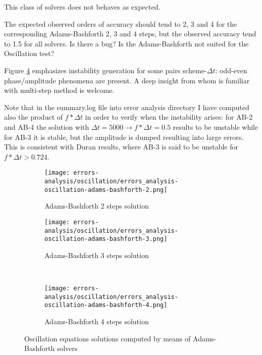 \documentclass[pdftex,preprint,3p,times,numbers]{elsarticle}
\begin{document}
{\color{red}This class of solvers does not behaves as expected.

The expected observed orders of accuracy should tend to 2, 3 and 4 for the corresponding Adams-Bashforth 2, 3 and 4 steps, but the observed accuracy tend to 1.5 for all solvers. Is there a bug? Is the Adams-Bashforth not suited for the Oscillation test?

Figure \ref{fig:results-oscillation-adams-bashforth} emphasizes instability generation for some pairs scheme-$\Delta t$: odd-even phase/amplitude phenomena are present. A deep insight from whom is familiar with multi-step method is welcome.

Note that in the summary.log file into error analysis directory I have computed also the product of $f*\Delta t$ in order to verify when the instability arises: for AB-2 and AB-4 the solution with $\Delta t=5000 \rightarrow f*\Delta t=0.5$ results to be unstable while for AB-3 it is stable, but the amplitude is dumped resulting into large errors. This is consistent with Duran results, where AB-3 is said to be unstable for $ f*\Delta t>0.724$.
}

\begin{figure}[!ht]
  \centering
  \begin{subfigure}[b]{0.45\textwidth}
    \centering
    \texttt{[image: errors-analysis/oscillation/errors\_analysis-oscillation-adams-bashforth-2.png]}
    \caption{Adams-Bashforth 2 steps solution}\label{fig:results-oscillation-adams-bashforth-2}
  \end{subfigure}\quad%
  \begin{subfigure}[b]{0.45\textwidth}
    \centering
    \texttt{[image: errors-analysis/oscillation/errors\_analysis-oscillation-adams-bashforth-3.png]}
    \caption{Adams-Bashforth 3 steps solution}\label{fig:results-oscillation-adams-bashforth-3}
  \end{subfigure}\\
  \begin{subfigure}[b]{0.45\textwidth}
    \centering
    \texttt{[image: errors-analysis/oscillation/errors\_analysis-oscillation-adams-bashforth-4.png]}
    \caption{Adams-Bashforth 4 steps solution}\label{fig:results-oscillation-adams-bashforth-4}
  \end{subfigure}
  \caption{Oscillation equations solutions computed by means of Adams-Bashforth solvers}\label{fig:results-oscillation-adams-bashforth}
\end{figure}
\end{document}
